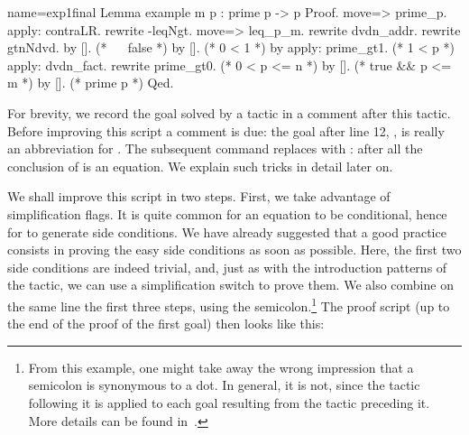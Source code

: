\begin{coq}{name=exp1final}{}
Lemma example m p : prime p -> p %
Proof.
move=> prime_p.
apply: contraLR.
rewrite -leqNgt.
move=> leq_p_m.
rewrite dvdn_addr.
  rewrite gtnNdvd.
    by [].  (* ~~ false *)
    by [].  (* 0 < 1 *)
  by apply: prime_gt1.  (* 1 < p *)
apply: dvdn_fact.
rewrite prime_gt0. (* 0 < p <= n *)
  by []. (* true && p <= m *)
by [].   (* prime p *)
Qed.
\end{coq}
For brevity, we record the goal solved by a tactic in a comment after
this tactic.  Before improving this script a comment is due:
the goal after line 12, , is really an abbreviation for
. The subsequent  command
replaces  with : after all the conclusion of
 is an equation.
We explain such tricks in detail later on.

We shall improve this script in two steps.  First, we take advantage of
 simplification flags.  It is quite common
for an equation to be conditional, hence for  to generate side
conditions.  We have already suggested that a good practice consists
in proving the easy side conditions
as soon as possible.  Here, the first two side conditions are indeed
trivial, and, just as with the introduction patterns of the  tactic,
we can use a simplification switch \C{//} to prove them.
We also combine on the same line the first three steps, using
the semicolon.\footnote{From this example, one might take away the
wrong impression that a semicolon is synonymous to a dot. In general,
it is not, since the tactic following it is applied to each goal resulting
from the tactic preceding it.
More details can be found in~\cite[``The tactic language'']{Coq:manual}.}
The proof script (up to the end of the proof of the first
goal) then looks like this:


